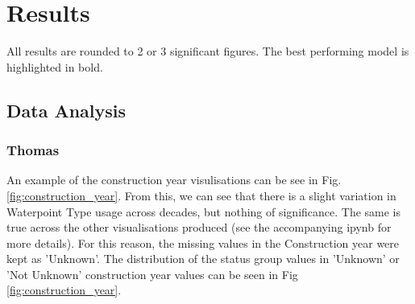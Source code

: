 \documentclass[conference]{IEEEtran}
\begin{document}
\section{Results} \label{ref:results}

All results are rounded to 2 or 3 significant figures. The best performing model is highlighted in bold.

\subsection{Data Analysis}

\subsubsection{Thomas}

An example of the construction year visulisations can be see in Fig. \ref{fig:construction_year}. From this, we can see that there is a slight variation in Waterpoint Type usage across decades, but nothing of significance. The same is true across the other visualisations produced (see the accompanying ipynb for more details). For this reason, the missing values in the Construction year were kept as 'Unknown'. The distribution of the status group values in 'Unknown' or 'Not Unknown' construction year values can be seen in Fig \ref{fig:construction_year}.
\end{document}
